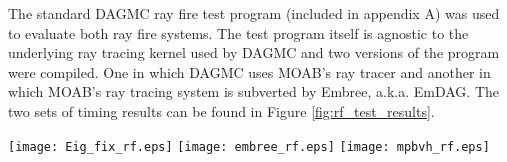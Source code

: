 The standard DAGMC ray fire test program (included in appendix A) was used to
evaluate both ray fire systems. The test program itself is agnostic to the
underlying ray tracing kernel used by DAGMC and two versions of the program were
compiled. One in which DAGMC uses MOAB's ray tracer and another in which MOAB's
ray tracing system is subverted by Embree, a.k.a. EmDAG. The two sets of timing
results can be found in Figure \ref{fig:rf_test_results}.

\begin{sidewaysfigure}[]
  \centering
  \texttt{[image: Eig\_fix\_rf.eps]}
  \texttt{[image: embree\_rf.eps]}
  \texttt{[image: mpbvh\_rf.eps]}
  \caption{Ray fire test results on three representative DAGMC volumes. Each
    data point represents the average ray fire time for 600k randomly directed
    rays from the origin of each volume. Top Left: Results of the tests for
    MOAB's OBB Tree. Top Right: Results of the tests for DAGMC coupled with
    Embree, or EmDAG. Bottom: Ray fire test results for DAGMC coupled with the
    MPBVH. The scale used for the MOAB OBB Tree is 10x greater than in the other
    two cases due to the slower speed.}
  \label{fig:rf_test_results}
\end{sidewaysfigure}

